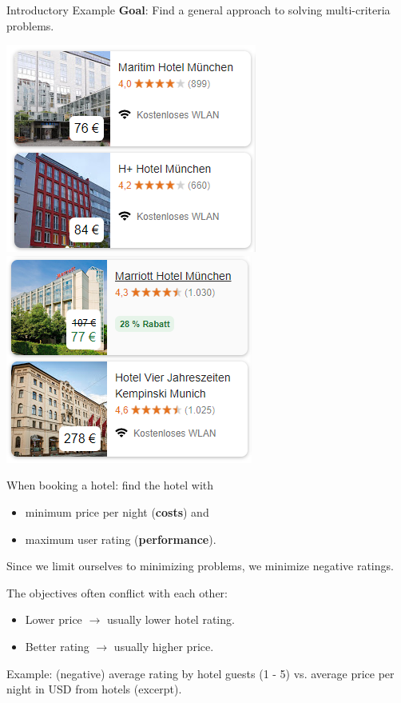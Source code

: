 \begin{frame}[allowframebreaks]{Introductory Example}
\textbf{Goal}: Find a general approach to solving multi-criteria problems.


\begin{center}
\includegraphics[width = 0.35\linewidth]{images/booking1.png} ~~~ \includegraphics[width = 0.35\linewidth]{images/booking2.png}
\end{center}

When booking a hotel: find the hotel with

\begin{itemize}
\item minimum price per night (\textbf{costs}) and
\item maximum user rating (\textbf{performance}).
\end{itemize}

\vfill

\begin{footnotesize}
Since we limit ourselves to minimizing problems, we minimize negative ratings.
\end{footnotesize}

\framebreak

The objectives often conflict with each other:

\begin{itemize}
\item Lower price $\to$ usually lower hotel rating.
\item Better rating $\to$ usually higher price.
\end{itemize}

Example: (negative) average rating by hotel guests (1 - 5) vs. average price per night in USD from hotels (excerpt).

\vspace*{0.2cm}


\end{frame}
